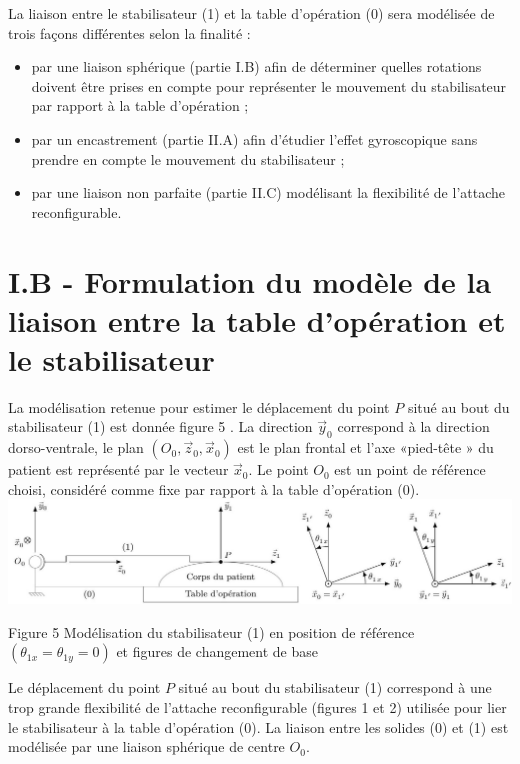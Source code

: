\documentclass[10pt]{article}
\begin{document}
La liaison entre le stabilisateur (1) et la table d'opération (0) sera modélisée de trois façons différentes selon la finalité :

\begin{itemize}
  \item par une liaison sphérique (partie I.B) afin de déterminer quelles rotations doivent être prises en compte pour représenter le mouvement du stabilisateur par rapport à la table d'opération ;

  \item par un encastrement (partie II.A) afin d'étudier l'effet gyroscopique sans prendre en compte le mouvement du stabilisateur ;

  \item par une liaison non parfaite (partie II.C) modélisant la flexibilité de l'attache reconfigurable.

\end{itemize}

\section{I.B - Formulation du modèle de la liaison entre la table d'opération et le stabilisateur}
La modélisation retenue pour estimer le déplacement du point $P$ situé au bout du stabilisateur (1) est donnée figure 5 . La direction $\vec{y}_{0}$ correspond à la direction dorso-ventrale, le plan $\left(O_{0}, \vec{z}_{0}, \vec{x}_{0}\right)$ est le plan frontal et l'axe «pied-tête » du patient est représenté par le vecteur $\vec{x}_{0}$. Le point $O_{0}$ est un point de référence choisi, considéré comme fixe par rapport à la table d'opération (0).
\includegraphics[max width=\textwidth, center]{2023_07_26_54f5e859400a10e656ddg-03}

Figure 5 Modélisation du stabilisateur (1) en position de référence $\left(\theta_{1 x}=\theta_{1 y}=0\right)$ et figures de changement de base

Le déplacement du point $P$ situé au bout du stabilisateur (1) correspond à une trop grande flexibilité de l'attache reconfigurable (figures 1 et 2) utilisée pour lier le stabilisateur à la table d'opération (0). La liaison entre les solides (0) et (1) est modélisée par une liaison sphérique de centre $O_{0}$.
\end{document}
